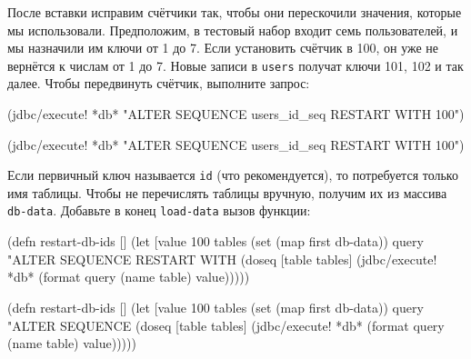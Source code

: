 \fi


После вставки исправим счётчики так, чтобы они перескочили значения, которые мы
использовали. Предположим, в тестовый набор входит семь пользователей, и мы
назначили им ключи от 1 до 7. Если установить счётчик в 100, он уже не вернётся
к числам от 1 до 7. Новые записи в \verb|users| получат ключи 101, 102 и так
далее. Чтобы передвинуть счётчик, выполните запрос:

\ifnarrow

\begin{english}
  \begin{clojure}
(jdbc/execute! *db*
  "ALTER SEQUENCE users_id_seq
   RESTART WITH 100")
  \end{clojure}
\end{english}

\else

\begin{english}
  \begin{clojure}
(jdbc/execute! *db*
  "ALTER SEQUENCE users_id_seq RESTART WITH 100")
  \end{clojure}
\end{english}

\fi

Если первичный ключ называется \verb|id| (что рекомендуется), то потребуется
только имя таблицы. Чтобы не перечислять таблицы вручную, получим их из массива
\verb|db-data|. Добавьте в конец \verb|load-data| вызов функции:


\ifnarrow

\begin{english}
  \begin{clojure}
(defn restart-db-ids []
  (let [value 100
        tables (set (map first db-data))
        query "ALTER SEQUENCE %
               RESTART WITH %
    (doseq [table tables]
      (jdbc/execute! *db*
        (format query
          (name table) value)))))
  \end{clojure}
\end{english}

\else

\begin{english}
  \begin{clojure}
(defn restart-db-ids []
  (let [value 100
        tables (set (map first db-data))
        query "ALTER SEQUENCE %
    (doseq [table tables]
      (jdbc/execute! *db*
         (format query (name table) value)))))
  \end{clojure}
\end{english}

